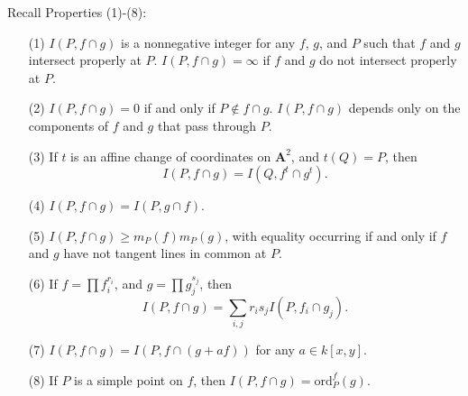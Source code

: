 \documentclass{article}
\begin{document}
Recall Properties (1)-(8):
\begin{enumerate}
\item[(1)]
  $I(P, f \cap g)$ is a nonnegative integer for any $f$, $g$,
  and $P$ such that $f$ and $g$ intersect properly at $P$.
  $I(P, f \cap g) = \infty$ if $f$ and $g$ do not intersect properly at $P$.

\item[(2)]
  $I(P, f \cap g) = 0$ if and only if $P \not\in f \cap g$.
  $I(P, f \cap g)$ depends only on the components of $f$ and $g$ that pass through $P$.

\item[(3)]
  If $t$ is an affine change of coordinates on $\mathbf{A}^2$,
  and $t(Q) = P$, then
  \[
    I(P, f \cap g) = I(Q, f^t \cap g^t).
  \]

\item[(4)]
  $I(P, f \cap g) = I(P, g \cap f)$.

\item[(5)]
  $I(P, f \cap g) \geq m_P(f) m_P(g)$,
  with equality occurring if and only if $f$ and $g$ have not tangent lines in common at $P$.

\item[(6)]
  If $f = \prod f_i^{r_i}$, and $g = \prod g_j^{s_j}$, then
  \[
    I(P, f \cap g) = \sum_{i, j} r_i s_j I(P, f_i \cap g_j).
  \]

\item[(7)]
  $I(P, f \cap g) = I(P, f \cap (g+af))$ for any $a \in k[x,y]$.

\item[(8)]
  If $P$ is a simple point on $f$, then $I(P, f \cap g) = \mathrm{ord}_P^{f}(g)$. \\
\end{enumerate}
\end{document}
